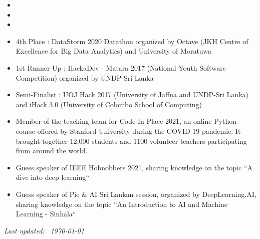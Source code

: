 \documentclass[10pt,a4paper,ragged2e,withhyper]{altacv}
\begin{document}

\begin{itemize}
    \item {}
    \item {}
    \item {}
\end{itemize}

\smallskip
{}
\begin{itemize}
    \item 4th Place : DataStorm 2020 Datathon organized by Octave (JKH Centre of Excellence for Big Data Analytics) and University of Moratuwa
    \item 1st Runner Up : HackaDev - Matara 2017 (National Youth Software Competition) organized by UNDP-Sri Lanka
    \item Semi-Finalist : UOJ Hack 2017 (University of Jaffna and UNDP-Sri Lanka) and iHack 3.0 (University of Colombo School of Computing)
\end{itemize}

\smallskip

\begin{itemize}
    \item Member of the teaching team for Code In Place 2021, an online Python course offered by Stanford University during the COVID-19 pandemic. It brought together 12,000 students and 1100 volunteer teachers participating from around the world.
    \item Guess speaker of IEEE Hobnobbers 2021, sharing knowledge on the topic ``A dive into deep learning``
    \item Guess speaker of Pie \& AI Sri Lankan session, organized by DeepLearning.AI, sharing knowledge on the topic ``An Introduction to AI and Machine Learning - Sinhala``
\end{itemize}

\smallskip



\vfill
\begin{flushright}
\flushright
\footnotesize{\emph{Last updated: ~\today }}
\end{flushright}
\end{document}
